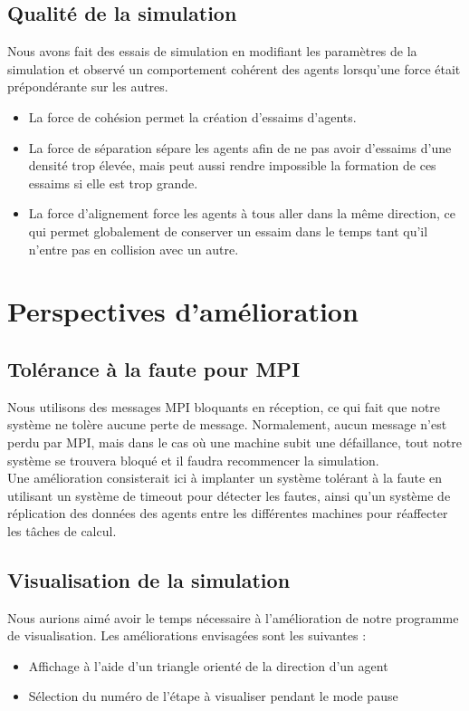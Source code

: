 \subsection{Qualité de la simulation}
Nous avons fait des essais de simulation en modifiant les paramètres de la simulation et observé un comportement cohérent des agents lorsqu'une force était prépondérante sur les autres.
\begin{itemize}
    \item La force de cohésion permet la création d'essaims d'agents.
    \item La force de séparation sépare les agents afin de ne pas avoir d'essaims d'une densité trop élevée, mais peut aussi rendre impossible la formation de ces essaims si elle est trop grande.
    \item La force d'alignement force les agents à tous aller dans la même direction, ce qui permet globalement de conserver un essaim dans le temps tant qu'il n'entre pas en collision avec un autre.
\end{itemize}



\section{Perspectives d'amélioration}

\subsection{Tolérance à la faute pour MPI}
Nous utilisons des messages MPI bloquants en réception, ce qui fait que notre système ne tolère aucune perte de message. Normalement, aucun message n'est perdu par MPI, mais dans le cas où une machine subit une défaillance, tout notre système se trouvera bloqué et il faudra recommencer la simulation.\\
Une amélioration consisterait ici à implanter un système tolérant à la faute en utilisant un système de timeout pour détecter les fautes, ainsi qu'un système de réplication des données des agents entre les différentes machines pour réaffecter les tâches de calcul.

\subsection{Visualisation de la simulation}
Nous aurions aimé avoir le temps nécessaire à l'amélioration de notre programme de visualisation. Les améliorations envisagées sont les suivantes :
\begin{itemize}
    \item Affichage à l'aide d'un triangle orienté de la direction d'un agent
    \item Sélection du numéro de l'étape à visualiser pendant le mode pause
\end{itemize}


